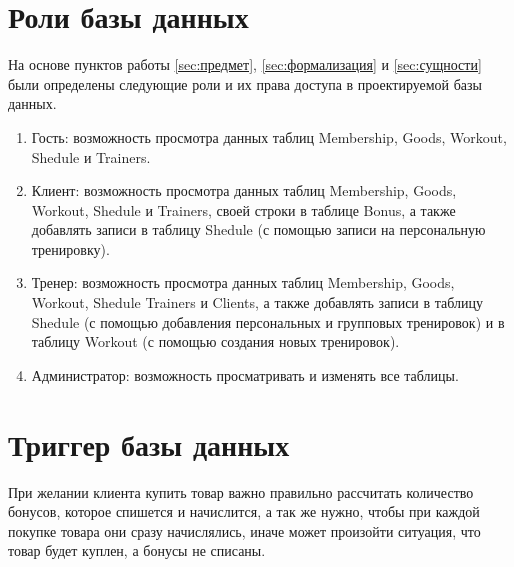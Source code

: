 \section{Роли базы данных}\label{sec:роли}
На основе пунктов работы \ref{sec:предмет}, \ref{sec:формализация} и \ref{sec:сущности} были определены следующие роли и их права доступа в проектируемой базы данных.

\begin{enumerate}[label=\arabic*)]
	\item Гость: возможность просмотра данных таблиц Membership, Goods, Workout, Shedule и Trainers.
	\item Клиент: возможность просмотра данных таблиц Membership, Goods, \newline Workout, Shedule и Trainers, своей строки в таблице Bonus, а также добавлять записи в таблицу Shedule (с помощью записи на персональную тренировку).
	\item Тренер: возможность просмотра данных таблиц Membership, Goods, \newline Workout, Shedule Trainers и Clients, а также добавлять записи в таблицу Shedule (с помощью добавления персональных и групповых тренировок) и в таблицу Workout (с помощью создания новых тренировок).
	\item Администратор: возможность просматривать и изменять все таблицы.
\end{enumerate}

\section{Триггер базы данных}\label{sec:триггер}

При желании клиента купить товар важно правильно рассчитать количество бонусов, которое спишется и начислится, а так же нужно, чтобы при каждой покупке товара они сразу начислялись, иначе может произойти ситуация, что товар будет куплен, а бонусы не списаны.

